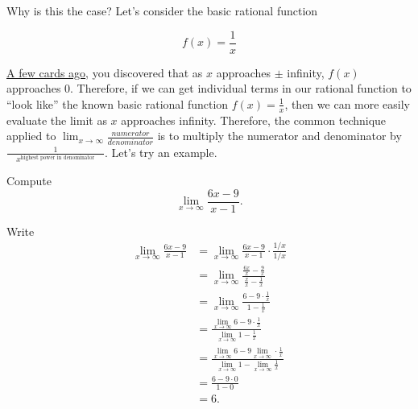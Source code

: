 \documentclass{ximera}
\begin{document}
Why is this the case? Let's consider the basic rational function

\[
f(x) = \frac{1}{x}
\]
\begin{image}
\end{image}

\href{https://ximera.osu.edu/math160fa17/m160exam1content/asymptotesAsLimits/breakGround}{A few cards ago}, you discovered that as $x$ approaches $\pm$ infinity, $f(x)$ approaches $0$. Therefore, if we can get individual terms in our rational function to ``look like'' the known basic rational function $f(x)=\frac{1}{x}$, then we can more easily evaluate the limit as $x$ approaches infinity. Therefore, the common technique applied to $\displaystyle\lim_{x\to \infty}\frac{numerator}{denominator}$ is to multiply the numerator and denominator by $\displaystyle\frac{1}{\phantom{xx}x^{\text{highest power in denominator}}\phantom{xx}}$.  Let's try an example. 

\begin{example} Compute
\[
\lim_{x\to\infty} \frac{6x-9}{x-1}.
\]
\begin{explanation}
Write
\begin{align*}
\lim_{x\to\infty}\frac{6x-9}{x-1} &= \lim_{x\to\infty}\frac{6x-9}{x-1}\cdot \frac{1/x}{1/x}\\
&=\lim_{x\to\infty}\frac{\frac{6x}{x} - \frac{9}{x}}{\frac{x}{x} - \frac{1}{x}}\\
&=\lim_{x\to\infty}\frac{6 - 9 \cdot \frac{1}{x}}{1 - \frac{1}{x}}\\
&=\frac{\lim_{x\to\infty} 6 - 9 \cdot \frac{1}{x}}{\lim_{x\to\infty} 1 - \frac{1}{x}} \\
&=\frac{\lim_{x\to\infty} 6 - 9 \lim_{x\to\infty} \cdot \frac{1}{x}}{\lim_{x\to\infty} 1 - \lim_{x\to\infty} \frac{1}{x}} \\
&=\frac{6 - 9 \cdot 0}{1 - 0} \\
&= 6.
\end{align*}
\end{explanation}
\end{example}
\end{document}
